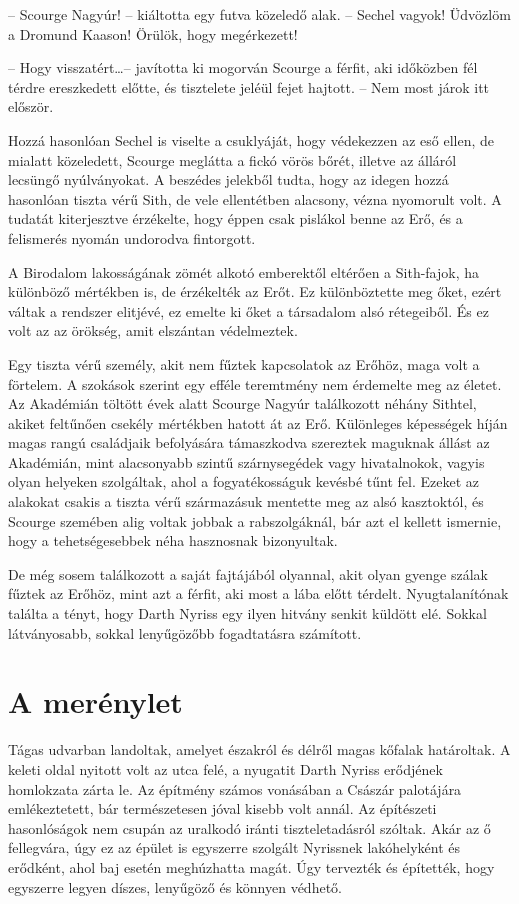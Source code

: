 \documentclass{thesis-ekf}
\theoremstyle{definition}
\begin{document}
-- Scourge Nagyúr! -- kiáltotta egy futva közeledő alak. -- Sechel vagyok! Üdvözlöm a
Dromund Kaason! Örülök, hogy megérkezett!

-- Hogy visszatért\dots -- javította ki mogorván Scourge a férfit, aki időközben fél térdre
ereszkedett előtte, és tisztelete jeléül fejet hajtott. -- Nem most járok itt először.

Hozzá hasonlóan Sechel is viselte a csuklyáját, hogy védekezzen az eső ellen, de mialatt
közeledett, Scourge meglátta a fickó vörös bőrét, illetve az álláról lecsüngő nyúlványokat. A
beszédes jelekből tudta, hogy az idegen hozzá hasonlóan tiszta vérű Sith, de vele ellentétben
alacsony, vézna nyomorult volt. A tudatát kiterjesztve érzékelte, hogy éppen csak pislákol
benne az Erő, és a felismerés nyomán undorodva fintorgott.

A Birodalom lakosságának zömét alkotó emberektől eltérően a Sith-fajok, ha különböző
mértékben is, de érzékelték az Erőt. Ez különböztette meg őket, ezért váltak a rendszer
elitjévé, ez emelte ki őket a társadalom alsó rétegeiből. És ez volt az az örökség, amit
elszántan védelmeztek.

Egy tiszta vérű személy, akit nem fűztek kapcsolatok az Erőhöz, maga volt a förtelem. A
szokások szerint egy efféle teremtmény nem érdemelte meg az életet. Az Akadémián töltött
évek alatt Scourge Nagyúr találkozott néhány Sithtel, akiket feltűnően csekély mértékben hatott
át az Erő. Különleges képességek híján magas rangú családjaik befolyására támaszkodva
szereztek maguknak állást az Akadémián, mint alacsonyabb szintű szárnysegédek vagy
hivatalnokok, vagyis olyan helyeken szolgáltak, ahol a fogyatékosságuk kevésbé tűnt fel.
Ezeket az alakokat csakis a tiszta vérű származásuk mentette meg az alsó kasztoktól, és
Scourge szemében alig voltak jobbak a rabszolgáknál, bár azt el kellett ismernie, hogy a
tehetségesebbek néha hasznosnak bizonyultak.\cite{John}

De még sosem találkozott a saját fajtájából olyannal, akit olyan gyenge szálak fűztek az
Erőhöz, mint azt a férfit, aki most a lába előtt térdelt. Nyugtalanítónak találta a tényt, hogy
Darth Nyriss egy ilyen hitvány senkit küldött elé. Sokkal látványosabb, sokkal lenyűgözőbb
fogadtatásra számított.
\section{A merénylet}
Tágas udvarban landoltak, amelyet északról és délről magas kőfalak határoltak. A keleti oldal
nyitott volt az utca felé, a nyugatit Darth Nyriss erődjének homlokzata zárta le. Az építmény
számos vonásában a Császár palotájára emlékeztetett, bár természetesen jóval kisebb volt
annál. Az építészeti hasonlóságok nem csupán az uralkodó iránti tiszteletadásról szóltak. Akár
az ő fellegvára, úgy ez az épület is egyszerre szolgált Nyrissnek lakóhelyként és erődként, ahol
baj esetén meghúzhatta magát. Úgy tervezték és építették, hogy egyszerre legyen díszes,
lenyűgöző és könnyen védhető.
\end{document}
